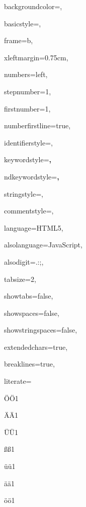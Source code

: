 \documentclass[master,english]{hgbthesis}
\begin{document}
 {%


  backgroundcolor=\color{editorGray},

  basicstyle={\footnotesize\ttfamily},   

  frame=b,


  xleftmargin={0.75cm},

  numbers=left,

  stepnumber=1,

  firstnumber=1,

  numberfirstline=true,	


  identifierstyle=\color{black},

  keywordstyle=\color{blue}\bfseries,

  ndkeywordstyle=\color{editorGreen}\bfseries,

  stringstyle=\color{editorOcher}\ttfamily,

  commentstyle=\color{brown}\ttfamily,


  language=HTML5,

  alsolanguage=JavaScript,

  alsodigit={.:;},	

  tabsize=2,

  showtabs=false,

  showspaces=false,

  showstringspaces=false,

  extendedchars=true,

  breaklines=true,


  literate=%

  {Ö}{{\"O}}1

  {Ä}{{\"A}}1

  {Ü}{{\"U}}1

  {ß}{{\ss}}1

  {ü}{{\"u}}1

  {ä}{{\"a}}1

  {ö}{{\"o}}1

}




\end{document}
